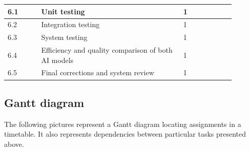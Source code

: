 \documentclass{article}
\begin{document}
\begin{center}
\begin{tabular}{ |p{0.13\linewidth}|p{0.55\linewidth}|p{0.20\linewidth}| }
        \hline
        6.1                                                                     & Unit testing                                         & 1                \\
        \hline
        6.2                                                                     & Integration testing                                  & 1                \\
        \hline
        6.3                                                                     & System testing                                       & 1                \\
        \hline
        6.4                                                                     & Efficiency and quality comparison of both AI models  & 1                \\
        \hline
        6.5                                                                     & Final corrections and system review                  & 1                \\
        \hline
    \end{tabular}
\end{center}

\newpage
\subsection{Gantt diagram}

The following pictures represent a Gantt diagram locating assignments in a timetable. It also represents dependencies between particular tasks presented above.
\end{document}
